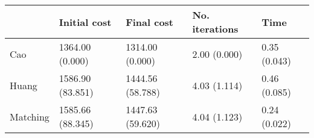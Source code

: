 \begin{tabular}{lllll}
\toprule
{} &      Initial cost &        Final cost & No. iterations &          Time \\
\midrule
Cao      &   1364.00 (0.000) &   1314.00 (0.000) &   2.00 (0.000) &  0.35 (0.043) \\
Huang    &  1586.90 (83.851) &  1444.56 (58.788) &   4.03 (1.114) &  0.46 (0.085) \\
Matching &  1585.66 (88.345) &  1447.63 (59.620) &   4.04 (1.123) &  0.24 (0.022) \\
\bottomrule
\end{tabular}
